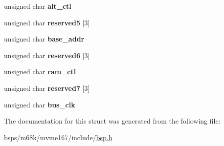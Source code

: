 \begin{DoxyCompactItemize}
unsigned char {\bfseries alt\+\_\+ctl}
\item 
\mbox{\label{structmemc040__regs___a5fd78679dbac3e3654fdca897ea4510c}} 
unsigned char {\bfseries reserved5} \mbox{[}3\mbox{]}
\item 
\mbox{\label{structmemc040__regs___a830ce3165bdd18a9a3d86098e3c6ded9}} 
unsigned char {\bfseries base\+\_\+addr}
\item 
\mbox{\label{structmemc040__regs___a87dd66cc356af704b3f3bc3ee4f42f25}} 
unsigned char {\bfseries reserved6} \mbox{[}3\mbox{]}
\item 
\mbox{\label{structmemc040__regs___a8c04fd1e0ecb9cbfea908a2b92feb84c}} 
unsigned char {\bfseries ram\+\_\+ctl}
\item 
\mbox{\label{structmemc040__regs___a9422ee6a323854941136adb3a2470b52}} 
unsigned char {\bfseries reserved7} \mbox{[}3\mbox{]}
\item 
\mbox{\label{structmemc040__regs___ad9ce15402ac7c095721df56aa21b6532}} 
unsigned char {\bfseries bus\+\_\+clk}
\end{DoxyCompactItemize}


The documentation for this struct was generated from the following file\+:\begin{DoxyCompactItemize}
\item 
bsps/m68k/mvme167/include/\mbox{\hyperlink{bsps_2m68k_2mvme167_2include_2bsp_8h}{bsp.\+h}}\end{DoxyCompactItemize}

